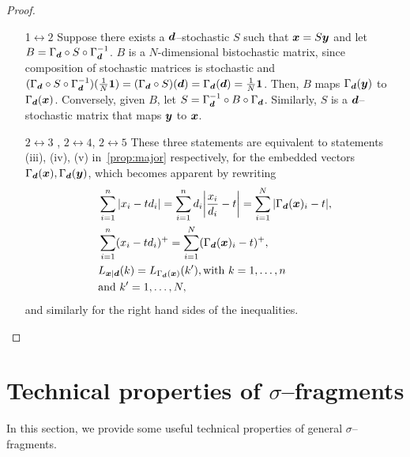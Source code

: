 \begin{proof}$ $\vspace{-12pt}\\
\begin{enumerate}
	\item[1$\leftrightarrow2$]
	Suppose there exists a $\bm{d}$--stochastic $S$ such that $\bm{x} = S\bm{y}$ and let $B = \Gamma_{\bm{d}} \circ S \circ \Gamma_{\bm{d}}^{-1}$.
$B$ is a $N$-dimensional bistochastic matrix, since composition of stochastic matrices is stochastic and $(\Gamma_{\bm{d}} \circ S \circ \Gamma_{\bm{d}}^{-1}) (\frac{1}{N}\bm{1}) = (\Gamma_{\bm{d}} \circ S) (\bm{d}) = \Gamma_{\bm{d}}(\bm{d}) = \frac{1}{N}\bm{1}$. Then, $B$ maps $\Gamma_{\bm{d}}({\bm{y}})$ to $\Gamma_{\bm{d}}({\bm{x}})$.
	Conversely, given $B$, let $S = \Gamma_{\bm{d}}^{-1} \circ B \circ \Gamma_{\bm{d}}$.
	Similarly, $S$ is a $\bm{d}$--stochastic matrix that maps $\bm{y}$ to $\bm{x}$.
	\item[$2\leftrightarrow3$]\hspace{-5pt}, $2\leftrightarrow4$, $2\leftrightarrow5$ These three statements are equivalent to statements (iii), (iv), (v) in~\cref{prop:major} respectively, for the embedded vectors $\Gamma_{\bm{d}}({\bm{x}}), \Gamma_{\bm{d}}({\bm{y}})$, which becomes apparent by rewriting
	\begin{align*}
	&\sum\limits_{i=1}^n \abs{x_i - t d_i} = \sum\limits_{i=1}^n d_i \abs{\frac{x_i}{d_i} - t} = \sum\limits_{i=1}^N \abs{\Gamma_{\bmd}(\bmx)_i - t}, \\
	&\sum\limits_{i=1}^n (x_i - t d_i)^+ = \sum\limits_{i=1}^N (\Gamma_{\bmd}(\bmx)_i - t)^+, \\
	&L_{\bmx|\bmd}(k) = L_{\Gamma_{\bmd}(\bmx)}(k'), \text{with}\ k=1,\dots,n\ \\
	&\text{and}\ k'=1,\dots,N, \nonumber
	\end{align*} 
and similarly for the right hand sides of the inequalities.
\end{enumerate}
\vspace{-19pt}
\end{proof}


\section{Technical properties of $\sigma$--fragments}
\label{app:frag}

In this section, we provide some useful technical properties of general $\sigma$--fragments.

